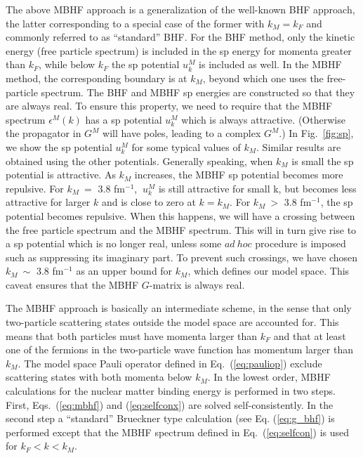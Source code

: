 The above MBHF approach is a generalization of the well-known BHF 
approach, the latter corresponding to a special case of the former 
with $k_M=k_F$ and commonly referred to as ``standard'' BHF.
For the BHF method, only the kinetic energy (free particle spectrum)
is included in the sp energy for  momenta greater than
$k_F$, while below $k_F$ the sp potential $u^M_k$ is included
as well. In the MBHF method, the corresponding boundary
is at $k_M$, beyond which one uses the free-particle spectrum.
The BHF and MBHF sp energies are constructed so that 
they are always real. 
To ensure this property, we need to require  that the MBHF spectrum 
$\epsilon ^M(k)$  
has a sp  potential 
$u^M_k$ which is always attractive. 
(Otherwise the propagator in
$G^M$ will have poles, leading to a complex $G^M$.) 
In Fig.\ \ref{fig:sp}, 
we show the
sp potential $u^M_k$ for some typical values of $k_M$.
Similar results are obtained using the other potentials. 
Generally speaking, when $k_M$ is small the sp potential is attractive.
As $k_M$ increases, the MBHF sp potential  becomes more repulsive. 
For $k_M~ =$ 3.8 fm$^{-1}$,  $\ u^M_k$  is still attractive
for small k, 
but becomes less attractive  for larger 
$k$ and is close to zero  at $k=k_M$. For $k_M~ >$ 3.8 fm$^{-1}$,
the sp  potential  becomes repulsive.
When this happens, we will have a crossing between the free 
particle spectrum and the MBHF spectrum. 
This will in turn give rise to a  sp potential
which is no longer real, 
unless
some $ad~hoc$ procedure is imposed such as suppressing its 
imaginary part.
To prevent such crossings, we have chosen 
$k_M~ \sim$ 3.8 fm$^{-1}$ as an
upper bound for $k_M$, which defines our model space.
This caveat ensures that the MBHF $G$-matrix
is always real. 

The MBHF approach is basically an intermediate scheme, 
in the sense that
only two-particle 
scattering states outside  the model space are accounted for. 
This means that both particles must have momenta larger than $k_F$ 
and that at least one of the fermions in the two-particle wave function
has momentum larger than $k_M$. 
The model space Pauli operator defined in Eq.\ (\ref{eq:pauliop})
exclude scattering states with both momenta below $k_M$. 
In the lowest order, MBHF calculations for the nuclear matter binding 
energy is performed in two steps. 
First, Eqs.\ (\ref{eq:mbhf}) and (\ref{eq:selfconx}) are
solved self-consistently.
In the second step a ``standard'' Brueckner type calculation 
(see Eq. (\ref{eq:g_bhf}) is performed
except that the MBHF spectrum  defined in Eq.\ (\ref{eq:selfcon})
is used for $k_F<k<k_M$. 


